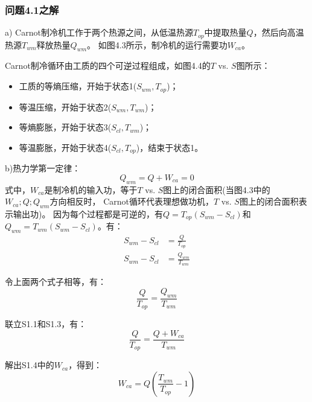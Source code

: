 \subsubsection{问题4.1之解}
a) Carnot制冷机工作于两个热源之间，从低温热源$T_{op}$中提取热量$Q$，然后向高温热源$T_{wm}$释放热量$Q_{wm}$。
如图4.3所示，制冷机的运行需要功$W_{ca}$。

Carnot制冷循环由工质的四个可逆过程组成，如图4.4的$T$ vs. $S$图所示：
\begin{itemize}
	\item 工质的等熵压缩，开始于状态1($S_{wm}, T_{op}$)；
	\item 等温压缩，开始于状态2($S_{wm},T_{wm}$)；
	\item 等熵膨胀，开始于状态3($S_{cl},T_{wm}$)；
	\item 等温膨胀，开始于状态4($S_{cl},T_{op}$)，结束于状态1。
\end{itemize}

b)热力学第一定律：
\begin{equation*}%
Q_{wm}=Q+W_{ca}=0 \tag{S1.1}
\end{equation*}
式中，$W_{ca}$是制冷机的输入功，等于$T$ vs. $S$图上的闭合面积(当图4.3中的$W_{ca}; Q; Q_{wm}$方向相反时，
Carnot循环代表理想做功机，$T$ vs. $S$图上的闭合面积表示输出功)。
因为每个过程都是可逆的，有$Q=T_{op}(S_{wm}-S_{cl})$和$Q_{wm}=T_{wm}(S_{wm}-S_{cl})$。有：
\begin{align*}%
S_{wm}-S_{cl}&=\frac{Q}{T_{op}}\tag{S1.2a}\\
S_{wm}-S_{cl}&=\frac{Q_{wm}}{T_{wm}}\tag{S1.2b}
\end{align*}

令上面两个式子相等，有：
\begin{equation}%
\frac{Q}{T_{op}}=\frac{Q_{wm}}{T_{wm}} \tag{S1.3}
\end{equation}

联立S1.1和S1.3，有：
\begin{equation*}%
\frac{Q}{T_{op}}=\frac{Q+W_{ca}}{T_{wm}} \tag{S1.4}
\end{equation*}

解出S1.4中的$W_{ca}$，得到：
\begin{equation*}%
W_{ca}=Q\left(\frac{T_{wm}}{T_{op}}-1\right) \tag{4.1}
\end{equation*}


